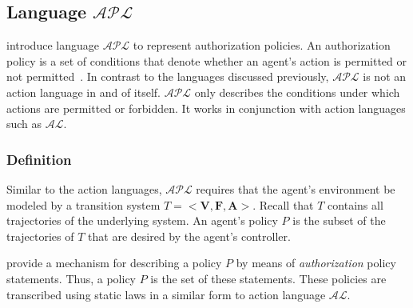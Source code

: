 \subsection{Language $\mathcal{APL}$}
\label{subsec:apl}

\citet{gelfond_authorization_2008} introduce language $\mathcal{APL}$ to represent authorization policies.
An authorization policy is a set of conditions that denote whether an agent's action is permitted or not permitted~\citep{gelfond_authorization_2008}.
In contrast to the languages discussed previously, $\mathcal{APL}$ is not an action language in and of itself.
$\mathcal{APL}$ only describes the conditions under which actions are permitted or forbidden.
It works in conjunction with action languages such as $\mathcal{AL}$.

\subsubsection{Definition}

Similar to the action languages, $\mathcal{APL}$ requires that the agent's environment be modeled by a transition system $T=<\boldsymbol{V},\boldsymbol{F},\boldsymbol{A}>$.
Recall that $T$ contains all trajectories of the underlying system.
An agent's policy $P$ is the subset of the trajectories of $T$ that are desired by the agent's controller.

\citet{gelfond_authorization_2008} provide a mechanism for describing a policy $P$ by means of \textit{authorization} policy statements.
Thus, a policy $P$ is the set of these statements.
These policies are transcribed using static laws in a similar form to action language $\mathcal{AL}$.

